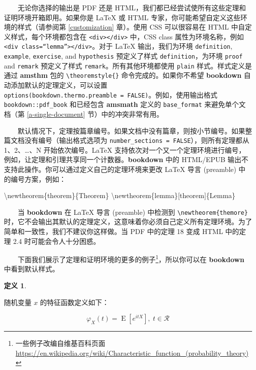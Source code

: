 \documentclass[
  12pt,
]{krantz}
\newenvironment{Shaded}{\begin{snugshade}}{\end{snugshade}}
\newcommand{\FunctionTok}[1]{\textcolor[rgb]{0.00,0.00,0.00}{#1}}
\newcommand{\NormalTok}[1]{#1}
\theoremstyle{definition}
\newtheorem{definition}{定义}[chapter]
\theoremstyle{definition}
\theoremstyle{definition}
\theoremstyle{definition}
\theoremstyle{remark}
\begin{document}
  无论你选择的输出是 PDF 还是 HTML，我们都已经尝试使所有这些定理和证明环境开箱即用。如果你是 LaTeX 或 HTML 专家，你可能希望自定义这些环境的样式（请参阅第 \ref{customization} 章）。使用 CSS 可以很容易在 HTML 中自定义样式，每个环境都包含在 \texttt{\textless{}div\textgreater{}\textless{}/div\textgreater{}} 中，CSS class 属性为环境名称，例如 \texttt{\textless{}div\ class=“lemma”\textgreater{}\textless{}/div\textgreater{}}。对于 LaTeX 输出，我们为环境 \texttt{definition}, \texttt{example}, \texttt{exercise}, and \texttt{hypothesis} 预定义了样式 \texttt{definition}，为环境 \texttt{proof} and \texttt{remark} 预定义了样式 \texttt{remark}。所有其他环境都使用 \texttt{plain} 样式。样式定义是通过 \textbf{amsthm} 包的 \texttt{\textbackslash{}theoremstyle\{\}} 命令完成的。如果你不希望 \textbf{bookdown} 自动添加默认的定理定义，可以设置 \texttt{options(bookdown.thermo.preamble\ =\ FALSE)}。例如，使用输出格式 \texttt{bookdown::pdf\_book} 和已经包含 \textbf{amsmath} 定义的 \texttt{base\_format} 来避免单个文档（第 \ref{a-single-document} 节）中的冲突非常有用。

  默认情况下，定理按篇章编号。如果文档中没有篇章，则按小节编号。如果整篇文档没有编号（输出格式选项为 \texttt{number\_sections\ =\ FALSE}），则所有定理都从 1、2、\ldots、N 开始依次编号。LaTeX 支持依次对一个又一个定理环境进行编号，例如，让定理和引理共享同一个计数器。\textbf{bookdown} 中的 HTML/EPUB 输出不支持此操作。你可以通过定义自己的定理环境来更改 LaTeX 导言 (preamble) 中的编号方案，例如：

\begin{Shaded}
\begin{Highlighting}[]
\FunctionTok{\textbackslash{}newtheorem}\NormalTok{\{theorem\}\{Theorem\}}
\FunctionTok{\textbackslash{}newtheorem}\NormalTok{\{lemma\}[theorem]\{Lemma\}}
\end{Highlighting}
\end{Shaded}

  当 \textbf{bookdown} 在 LaTeX 导言 (preamble) 中检测到 \texttt{\textbackslash{}newtheorem\{themore\}} 时，它不会输出其默认的定理定义，这意味着你必须自己定义所有定理环境。为了简单和一致性，我们不建议你这样做。当 PDF 中的定理 18 变成 HTML 中的定理 2.4 时可能会令人十分困惑。

  下面我们展示了定理和证明环境的更多的例子\footnote{一些例子改编自维基百科页面 \url{https://en.wikipedia.org/wiki/Characteristic_function_(probability_theory)}}，所以你可以在 \textbf{bookdown} 中看到默认样式。

\begin{definition}
\protect\hypertarget{def:unlabeled-div-1}{}\label{def:unlabeled-div-1}

随机变量 \(x\) 的特征函数定义如下：

\[\varphi _{X}(t)=\operatorname {E} \left[e^{itX}\right], \; t\in\mathcal{R}\]

\end{definition}
\end{document}
